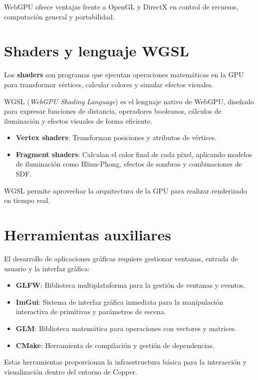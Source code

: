 WebGPU ofrece ventajas frente a OpenGL y DirectX en control de recursos,
computación general y portabilidad.

\section{Shaders y lenguaje WGSL}

Los \textbf{shaders} son programas que ejecutan operaciones matemáticas en la
GPU para transformar vértices, calcular colores y simular efectos visuales.

WGSL (\textit{WebGPU Shading Language}) es el lenguaje nativo de WebGPU,
diseñado para expresar funciones de distancia, operadores booleanos, cálculos
de iluminación y efectos visuales de forma eficiente.

\begin{itemize}
    \item \textbf{Vertex shaders}: Transforman posiciones y atributos de vértices.
    \item \textbf{Fragment shaders}: Calculan el color final de cada píxel, aplicando modelos de iluminación como Blinn-Phong, efectos de sombras y combinaciones de SDF.
\end{itemize}

WGSL permite aprovechar la arquitectura de la GPU para realizar renderizado en
tiempo real.

\section{Herramientas auxiliares}

El desarrollo de aplicaciones gráficas requiere gestionar ventanas, entrada de
usuario y la interfaz gráfica:

\begin{itemize}
    \item \textbf{GLFW}: Biblioteca multiplataforma para la gestión de ventanas y eventos.
    \item \textbf{ImGui}: Sistema de interfaz gráfica inmediata para la manipulación interactiva de primitivas y parámetros de escena.
    \item \textbf{GLM}: Biblioteca matemática para operaciones con vectores y matrices.
    \item \textbf{CMake}: Herramienta de compilación y gestión de dependencias.
\end{itemize}

Estas herramientas proporcionan la infraestructura básica para la interacción y
visualización dentro del entorno de Copper.
